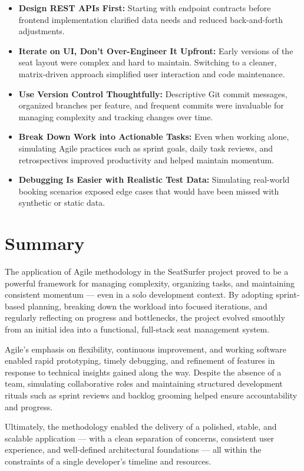 \documentclass[12pt,a4paper]{report} %
\begin{document}
\begin{itemize}
\item \textbf{Design REST APIs First:}
Starting with endpoint contracts before frontend implementation clarified data needs and reduced back-and-forth adjustments.
\item \textbf{Iterate on UI, Don’t Over-Engineer It Upfront:}  
Early versions of the seat layout were complex and hard to maintain. Switching to a cleaner, matrix-driven approach simplified user interaction and code maintenance.
\item \textbf{Use Version Control Thoughtfully:}  
Descriptive Git commit messages, organized branches per feature, and frequent commits were invaluable for managing complexity and tracking changes over time.
\item \textbf{Break Down Work into Actionable Tasks:}  
Even when working alone, simulating Agile practices such as sprint goals, daily task reviews, and retrospectives improved productivity and helped maintain momentum.
\item \textbf{Debugging Is Easier with Realistic Test Data:}  
Simulating real-world booking scenarios exposed edge cases that would have been missed with synthetic or static data.
\end{itemize}

\section{Summary}

The application of Agile methodology in the SeatSurfer project proved to be a powerful framework for managing complexity, organizing tasks, and maintaining consistent momentum — even in a solo development context. By adopting sprint-based planning, breaking down the workload into focused iterations, and regularly reflecting on progress and bottlenecks, the project evolved smoothly from an initial idea into a functional, full-stack seat management system.

Agile's emphasis on flexibility, continuous improvement, and working software enabled rapid prototyping, timely debugging, and refinement of features in response to technical insights gained along the way. Despite the absence of a team, simulating collaborative roles and maintaining structured development rituals such as sprint reviews and backlog grooming helped ensure accountability and progress.

Ultimately, the methodology enabled the delivery of a polished, stable, and scalable application — with a clean separation of concerns, consistent user experience, and well-defined architectural foundations — all within the constraints of a single developer's timeline and resources.
\end{document}
